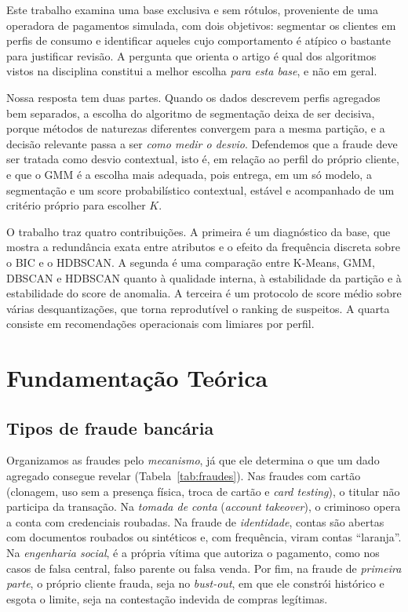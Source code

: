 \documentclass[12pt]{article}
\begin{document}
Este trabalho examina uma base exclusiva e sem rótulos, proveniente de uma operadora de pagamentos
simulada, com dois objetivos: segmentar os clientes em perfis de consumo e identificar aqueles cujo
comportamento é atípico o bastante para justificar revisão. A pergunta que orienta o artigo é qual
dos algoritmos vistos na disciplina constitui a melhor escolha \emph{para esta base}, e não em geral.

Nossa resposta tem duas partes. Quando os dados descrevem perfis agregados bem separados, a escolha
do algoritmo de segmentação deixa de ser decisiva, porque métodos de naturezas diferentes convergem
para a mesma partição, e a decisão relevante passa a ser \emph{como medir o desvio}. Defendemos que a
fraude deve ser tratada como desvio contextual, isto é, em relação ao perfil do próprio cliente, e que
o GMM é a escolha mais adequada, pois entrega, em um só modelo, a segmentação e um score probabilístico
contextual, estável e acompanhado de um critério próprio para escolher $K$.

O trabalho traz quatro contribuições. A primeira é um diagnóstico da base, que mostra a redundância
exata entre atributos e o efeito da frequência discreta sobre o BIC e o HDBSCAN. A segunda é uma
comparação entre K-Means, GMM, DBSCAN e HDBSCAN quanto à qualidade interna, à estabilidade da partição
e à estabilidade do score de anomalia. A terceira é um protocolo de score médio sobre várias
desquantizações, que torna reprodutível o ranking de suspeitos. A quarta consiste em recomendações
operacionais com limiares por perfil.

\section{Fundamentação Teórica}
\subsection{Tipos de fraude bancária}
Organizamos as fraudes pelo \emph{mecanismo}, já que ele determina o que um dado agregado consegue
revelar (Tabela~\ref{tab:fraudes}). Nas fraudes com cartão (clonagem, uso sem a presença física, troca
de cartão e \emph{card testing}), o titular não participa da transação. Na \emph{tomada de conta}
(\emph{account takeover}), o criminoso opera a conta com credenciais roubadas. Na fraude de
\emph{identidade}, contas são abertas com documentos roubados ou sintéticos e, com frequência, viram
contas ``laranja''. Na \emph{engenharia social}, é a própria vítima que autoriza o pagamento, como nos
casos de falsa central, falso parente ou falsa venda. Por fim, na fraude de \emph{primeira parte}, o
próprio cliente frauda, seja no \emph{bust-out}, em que ele constrói histórico e esgota o limite, seja
na contestação indevida de compras legítimas.
\end{document}

